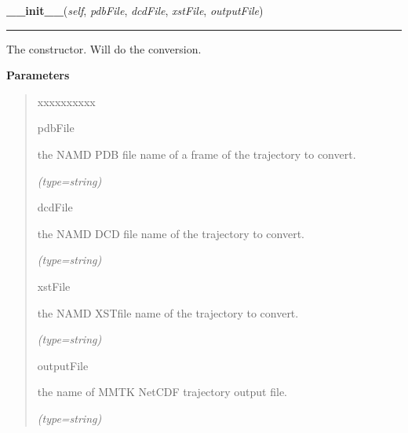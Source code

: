 \hspace{.8\funcindent}\begin{boxedminipage}{\funcwidth}

    \raggedright \textbf{\_\_init\_\_}(\textit{self}, \textit{pdbFile}, \textit{dcdFile}, \textit{xstFile}, \textit{outputFile})

    \vspace{-1.5ex}

    \rule{\textwidth}{0.5\fboxrule}
\setlength{\parskip}{2ex}
    The constructor. Will do the conversion.

\setlength{\parskip}{1ex}
      \textbf{Parameters}
      \vspace{-1ex}

      \begin{quote}
        \begin{Ventry}{xxxxxxxxxx}

          \item[pdbFile]

          the NAMD PDB file name of a frame of the trajectory to convert.

            {\it (type=string)}

          \item[dcdFile]

          the NAMD DCD file name of the trajectory to convert.

            {\it (type=string)}

          \item[xstFile]

          the NAMD XSTfile name of the trajectory to convert.

            {\it (type=string)}

          \item[outputFile]

          the name of MMTK NetCDF trajectory output file.

            {\it (type=string)}

        \end{Ventry}

      \end{quote}

    \end{boxedminipage}



